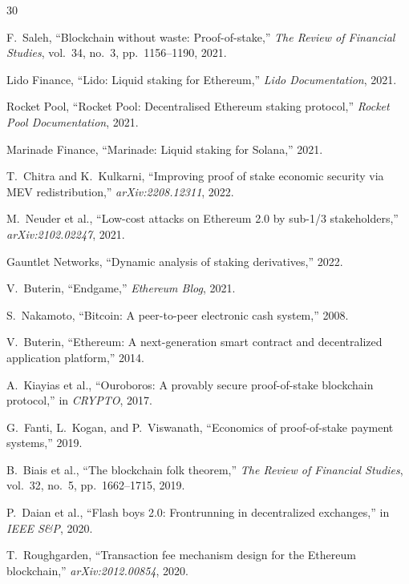 \documentclass[11pt,a4paper]{article}
\begin{document}

\begin{thebibliography}{30}

F.~Saleh, ``Blockchain without waste: Proof-of-stake,'' \emph{The Review of Financial Studies}, vol.~34, no.~3, pp.~1156--1190, 2021.

Lido Finance, ``Lido: Liquid staking for Ethereum,'' \emph{Lido Documentation}, 2021.

Rocket Pool, ``Rocket Pool: Decentralised Ethereum staking protocol,'' \emph{Rocket Pool Documentation}, 2021.

Marinade Finance, ``Marinade: Liquid staking for Solana,'' 2021.

T.~Chitra and K.~Kulkarni, ``Improving proof of stake economic security via MEV redistribution,'' \emph{arXiv:2208.12311}, 2022.

M.~Neuder et al., ``Low-cost attacks on Ethereum 2.0 by sub-1/3 stakeholders,'' \emph{arXiv:2102.02247}, 2021.

Gauntlet Networks, ``Dynamic analysis of staking derivatives,'' 2022.

V.~Buterin, ``Endgame,'' \emph{Ethereum Blog}, 2021.

S.~Nakamoto, ``Bitcoin: A peer-to-peer electronic cash system,'' 2008.

V.~Buterin, ``Ethereum: A next-generation smart contract and decentralized application platform,'' 2014.

A.~Kiayias et al., ``Ouroboros: A provably secure proof-of-stake blockchain protocol,'' in \emph{CRYPTO}, 2017.

G.~Fanti, L.~Kogan, and P.~Viswanath, ``Economics of proof-of-stake payment systems,'' 2019.

B.~Biais et al., ``The blockchain folk theorem,'' \emph{The Review of Financial Studies}, vol.~32, no.~5, pp.~1662--1715, 2019.

P.~Daian et al., ``Flash boys 2.0: Frontrunning in decentralized exchanges,'' in \emph{IEEE S\&P}, 2020.

T.~Roughgarden, ``Transaction fee mechanism design for the Ethereum blockchain,'' \emph{arXiv:2012.00854}, 2020.


\end{thebibliography}
\end{document}
